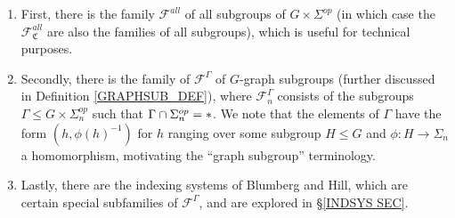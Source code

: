 \documentclass[a4paper,10pt
,draft
]{article}%
\numberwithin{equation}{section}
\numberwithin{figure}{section}
\theoremstyle{definition} %
\newcommand{\F}{\ensuremath{\mathcal F}}
\newcommand{\1}{\ensuremath{\mathbbm 1}}%
\begin{document}
\begin{enumerate}[label = (\alph*)]
\item First, there is the family $\F^{all}$ of all subgroups of $G \times \Sigma^{op}$
      (in which case the $\F^{all}_{\mathfrak{C}}$ are also the families of all subgroups), which is useful for technical purposes.
\item Secondly, there is the family of $\F^{\Gamma}$
      of $G$-graph subgroups (further discussed in Definition \ref{GRAPHSUB_DEF}), where $\F^{\Gamma}_n$
      consists of the subgroups
      $\Gamma \leq G \times \Sigma_n^{op}$
      such that $\Gamma \cap \Sigma_n^{op} = \**$.
      We note that the elements of $\Gamma$
      have the form $(h,\phi(h)^{-1})$
      for $h$ ranging over some subgroup $H \leq G$
      and $\phi \colon H \to \Sigma_n$
      a homomorphism,
      motivating the ``graph subgroup'' terminology.
\item Lastly, there are the indexing systems of Blumberg and Hill,
      which are certain special subfamilies of $\F^{\Gamma}$,
      and are explored in \S \ref{INDSYS SEC}.
\end{enumerate}
\end{document}
